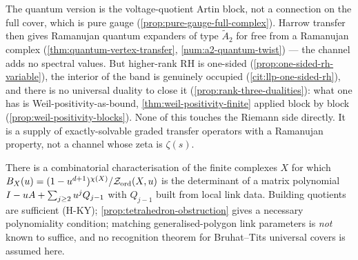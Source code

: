 The quantum version is the voltage-quotient Artin block, not a connection on the
full cover, which is pure gauge (\cref{prop:pure-gauge-full-complex}). Harrow
transfer then gives Ramanujan quantum expanders of type $\tilde A_2$ for free
from a Ramanujan complex (\cref{thm:quantum-vertex-transfer},
\cref{num:a2-quantum-twist}) --- the channel adds no spectral values. But
higher-rank RH is one-sided (\cref{prop:one-sided-rh-variable}), the interior of
the band is genuinely occupied (\cref{cit:llp-one-sided-rh}), and there is no
universal duality to close it (\cref{prop:rank-three-dualities}): what one has is
Weil-positivity-as-bound, \cref{thm:weil-positivity-finite} applied block by
block (\cref{prop:weil-positivity-blocks}). None of this touches the Riemann
side directly. It is a supply of exactly-solvable graded transfer operators with
a Ramanujan property, not a channel whose zeta is $\zeta(s)$.

\begin{conjecture}
\label{conj:vertex-collapse-characterisation}
There is a combinatorial characterisation of the finite complexes $X$ for which
$B_X(u) = (1-u^{d+1})^{\chi(X)}/\mathcal Z_{\mathrm{ord}}(X,u)$ is the
determinant of a matrix polynomial $I-u A+\sum_{j\ge2}u^jQ_{j-1}$ with
$Q_{j-1}$ built from local link data. Building quotients are sufficient
(H-KY); \cref{prop:tetrahedron-obstruction} gives a necessary polynomiality
condition; matching generalised-polygon link parameters is \emph{not} known to
suffice, and no recognition theorem for Bruhat--Tits universal covers is assumed
here.
\end{conjecture}
